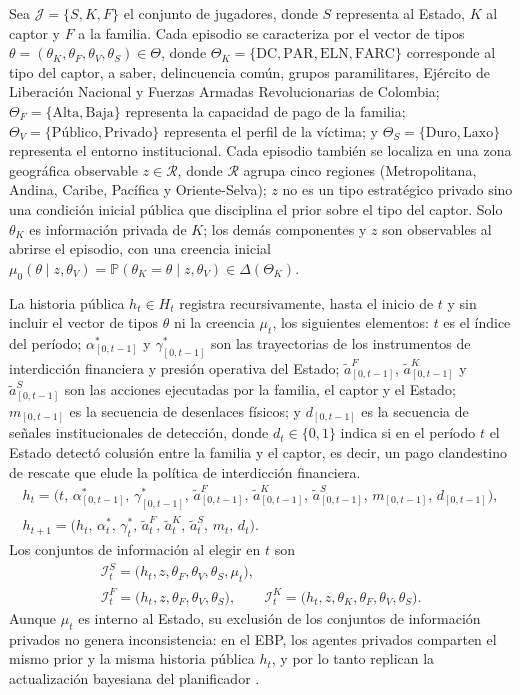 \documentclass[review,authoryear,12pt]{elsarticle}
\theoremstyle{plain}
\theoremstyle{definition}
\newcommand{\Prob}{\mathbb{P}}
\newcommand{\ThetaK}{\Theta_K}
\newcommand{\1}{\mathbf{1}}
\begin{document}
Sea $\mathcal{J}=\{S,K,F\}$ el conjunto de jugadores, donde $S$ representa al Estado, $K$ al captor y $F$ a la familia. Cada episodio se caracteriza por el vector de tipos $\theta=(\theta_K,\theta_F,\theta_V,\theta_S)\in\Theta$, donde $\ThetaK=\{\text{DC},\text{PAR},\text{ELN},\text{FARC}\}$ corresponde al tipo del captor, a saber, delincuencia común, grupos paramilitares, Ejército de Liberación Nacional y Fuerzas Armadas Revolucionarias de Colombia; $\Theta_F=\{\text{Alta},\text{Baja}\}$ representa la capacidad de pago de la familia; $\Theta_V=\{\text{Público},\text{Privado}\}$ representa el perfil de la víctima; y $\Theta_S=\{\text{Duro},\text{Laxo}\}$ representa el entorno institucional. Cada episodio también se localiza en una zona geográfica observable $z\in\mathcal{R}$, donde $\mathcal{R}$ agrupa cinco regiones (Metropolitana, Andina, Caribe, Pacífica y Oriente-Selva); $z$ no es un tipo estratégico privado sino una condición inicial pública que disciplina el prior sobre el tipo del captor. Solo $\theta_K$ es información privada de $K$; los demás componentes y $z$ son observables al abrirse el episodio, con una creencia inicial $\mu_0(\theta\mid z,\theta_V)=\Prob(\theta_K=\theta\mid z,\theta_V)\in\Delta(\ThetaK)$.


La historia pública $h_t\in H_t$ registra recursivamente, hasta el inicio de $t$ y sin incluir el vector de tipos $\theta$ ni la creencia $\mu_t$, los siguientes elementos: $t$ es el índice del período; $\alpha^\ast_{[0,t-1]}$ y $\gamma^\ast_{[0,t-1]}$ son las trayectorias de los instrumentos de interdicción financiera y presión operativa del Estado; $\tilde{a}^F_{[0,t-1]}$, $\tilde{a}^K_{[0,t-1]}$ y $\tilde{a}^S_{[0,t-1]}$ son las acciones ejecutadas por la familia, el captor y el Estado; $m_{[0,t-1]}$ es la secuencia de desenlaces físicos; y $d_{[0,t-1]}$ es la secuencia de señales institucionales de detección, donde $d_t\in\{0,1\}$ indica si en el período $t$ el Estado detectó colusión entre la familia y el captor, es decir, un pago clandestino de rescate que elude la política de interdicción financiera.
\begin{gather}
h_t = \bigl(t,\,\alpha^\ast_{[0,t-1]},\,\gamma^\ast_{[0,t-1]},\,\tilde{a}^F_{[0,t-1]},\,\tilde{a}^K_{[0,t-1]},\,\tilde{a}^S_{[0,t-1]},\,m_{[0,t-1]},\,d_{[0,t-1]}\bigr),\label{eq:historia-publica}\\
h_{t+1} = \bigl(h_t,\,\alpha_t^\ast,\,\gamma_t^\ast,\,\tilde{a}_t^F,\,\tilde{a}_t^K,\,\tilde{a}_t^S,\,m_t,\,d_t\bigr).\label{eq:actualizacion-historia}
\end{gather}
Los conjuntos de información al elegir en $t$ son
\begin{gather*}
\mathcal{I}_t^S=\bigl(h_t,z,\theta_F,\theta_V,\theta_S,\mu_t\bigr),\\
\mathcal{I}_t^F=\bigl(h_t,z,\theta_F,\theta_V,\theta_S\bigr),\qquad
\mathcal{I}_t^K=\bigl(h_t,z,\theta_K,\theta_F,\theta_V,\theta_S\bigr).
\end{gather*}
Aunque $\mu_t$ es interno al Estado, su exclusión de los conjuntos de información privados no genera inconsistencia: en el EBP, los agentes privados comparten el mismo prior y la misma historia pública $h_t$, y por lo tanto replican la actualización bayesiana del planificador \citet{FudenbergTirole1991}.
\end{document}
